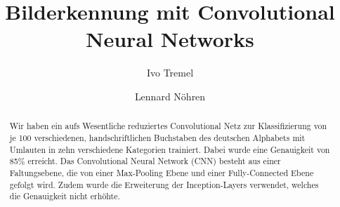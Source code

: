 \documentclass[runningheads,a4paper]{llncs}[2015/06/24]
\begin{document}
\title{Bilderkennung mit Convolutional Neural Networks}

\author{Ivo Tremel \and Lennard Nöhren}

%

			
\maketitle

\begin{abstract}
Wir haben ein aufs Wesentliche reduziertes Convolutional Netz zur Klassifizierung von je 100  verschiedenen, handschriftlichen Buchstaben des deutschen Alphabets mit Umlauten
in zehn verschiedene Kategorien trainiert. Dabei wurde eine Genauigkeit von 85\% erreicht. Das Convolutional Neural Network (CNN) besteht aus einer Faltungsebene, die von einer Max-Pooling Ebene und einer Fully-Connected Ebene gefolgt wird. Zudem wurde die Erweiterung der Inception-Layers verwendet, welches die Genauigkeit nicht erhöhte.
\end{abstract}


\end{document}

